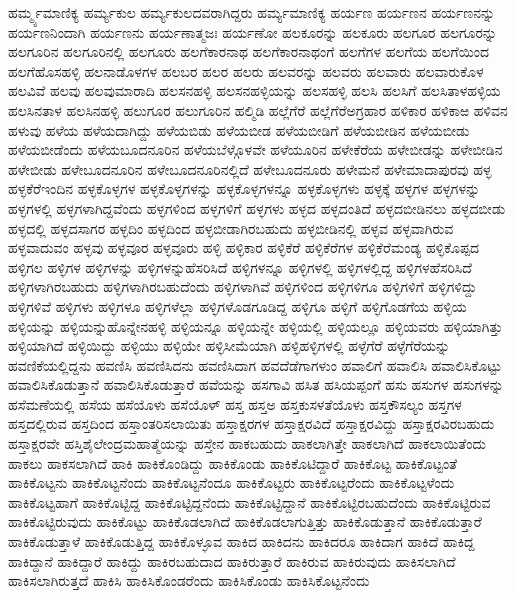 {ಹರ್ಮ್ಮ್ಯಮಾಣಿಕ್ಯ
ಹರ್ಮ್ಯಕುಲ
ಹರ್ಮ್ಯಕುಲದವರಾಗಿದ್ದರು
ಹರ್ಮ್ಯಮಾಣಿಕ್ಯ
ಹರ್ಯಣ
ಹರ್ಯಣನ
ಹರ್ಯಣನನ್ನು
ಹರ್ಯಣನಿಂದಾಗಿ
ಹರ್ಯಣನು
ಹರ್ಯಣಾತ್ಮಜಃ
ಹರ್ಯಣೋ
ಹಲಕೂರನ್ನು
ಹಲಕೂರು
ಹಲಗೂರ
ಹಲಗೂರನ್ನು
ಹಲಗೂರಿನ
ಹಲಗೂರಿನಲ್ಲಿ
ಹಲಗೂರು
ಹಲಗೆಕಾರನಾಥ
ಹಲಗೆಕಾರನಾಥಂಗೆ
ಹಲಗೆಗಳ
ಹಲಗೆಯ
ಹಲಗೆಯಿಂದ
ಹಲಗೆಹೊಸಹಳ್ಳಿ
ಹಲನಾಡೊಳಗಳ
ಹಲಬರ
ಹಲರ
ಹಲರು
ಹಲವರನ್ನು
ಹಲವರು
ಹಲವಾರು
ಹಲವಾರುಕೊಳ
ಹಲವಿವೆ
ಹಲವು
ಹಲವುಮಾರಾದಿ
ಹಲಸನಹಳ್ಳಿ
ಹಲಸನಹಳ್ಳಿಯನ್ನು
ಹಲಸಹಳ್ಳಿ
ಹಲಸಿ
ಹಲಸಿಗೆ
ಹಲಸಿತಾಳಹಳ್ಳಿಯ
ಹಲಸಿನತಾಳ
ಹಲಸಿನಹಳ್ಳಿ
ಹಲುಗೂರ
ಹಲುಗೂರಿನ
ಹಲ್ಮಿಡಿ
ಹಲ್ಲೆಗೆರೆ
ಹಲ್ಲೆಗೆರೆಅಗ್ರಹಾರ
ಹಳಿಕಾರ
ಹಳಿಕಾಱ
ಹಳಿವನ
ಹಳುವು
ಹಳೆಯ
ಹಳೆಯದಾಗಿದ್ದು
ಹಳೆಯಬಿಡು
ಹಳೆಯಬೀಡ
ಹಳೆಯಬೀಡಿಗೆ
ಹಳೆಯಬೀಡಿನ
ಹಳೆಯಬೀಡು
ಹಳೆಯಬೀಡೆಂದು
ಹಳೆಯಬೂದನೂರಿನ
ಹಳೆಯಬೆಳ್ಗೊಳವೇ
ಹಳೆಯೂರಿನ
ಹಳೇಕೆರೆಯ
ಹಳೇಬೀಡನ್ನು
ಹಳೇಬೀಡಿನ
ಹಳೇಬೀಡು
ಹಳೇಬೂದನೂರಿನ
ಹಳೇಬೂದನೂರಿನಲ್ಲಿದೆ
ಹಳೇಬೂದನೂರು
ಹಳೇಮನೆ
ಹಳೇಮಾದಾಪುರವು
ಹಳ್ಳ
ಹಳ್ಳಕೆರೆಇಂದಿನ
ಹಳ್ಳಕೊಳ್ಳಗಳ
ಹಳ್ಳಕೊಳ್ಳಗಳನ್ನು
ಹಳ್ಳಕೊಳ್ಳಗಳನ್ನೂ
ಹಳ್ಳಕೊಳ್ಳಗಳು
ಹಳ್ಳಕ್ಕೆ
ಹಳ್ಳಗಳ
ಹಳ್ಳಗಳನ್ನು
ಹಳ್ಳಗಳಲ್ಲಿ
ಹಳ್ಳಗಳಾಗಿದ್ದವೆಂದು
ಹಳ್ಳಗಳಿಂದ
ಹಳ್ಳಗಳಿಗೆ
ಹಳ್ಳಗಳು
ಹಳ್ಳದ
ಹಳ್ಳದಂತಿದೆ
ಹಳ್ಳದಬೀಡಿನಲು
ಹಳ್ಳದಬೀಡು
ಹಳ್ಳದಲ್ಲಿ
ಹಳ್ಳದಸಾಗರ
ಹಳ್ಳದಿಂ
ಹಳ್ಳದಿಂದ
ಹಳ್ಳಬೀಡಾಗಿರಬಹುದು
ಹಳ್ಳಬೀಡಿನಲ್ಲಿ
ಹಳ್ಳವ
ಹಳ್ಳವಾಗಿರುವ
ಹಳ್ಳವಾದುವಂ
ಹಳ್ಳವು
ಹಳ್ಳವೂರ
ಹಳ್ಳವೂರು
ಹಳ್ಳಿ
ಹಳ್ಳಿಕಾರ
ಹಳ್ಳಿಕೆರೆ
ಹಳ್ಳಿಕೆರೆಗಳ
ಹಳ್ಳಿಕೆರೆಮಂಡ್ಯ
ಹಳ್ಳಿಕೊಪ್ಪದ
ಹಳ್ಳಿಗಲ
ಹಳ್ಳಿಗಳ
ಹಳ್ಳಿಗಳನ್ನು
ಹಳ್ಳಿಗಳನ್ನುಹೆಸರಿಸಿದೆ
ಹಳ್ಳಿಗಳನ್ನೂ
ಹಳ್ಳಿಗಳಲ್ಲಿ
ಹಳ್ಳಿಗಳಲ್ಲಿದ್ದ
ಹಳ್ಳಿಗಳಹೆಸರಿಸಿದೆ
ಹಳ್ಳಿಗಳಾಗಿರಬಹುದು
ಹಳ್ಳಿಗಳಾಗಿರಬಹುದೆಂದು
ಹಳ್ಳಿಗಳಾಗಿವೆ
ಹಳ್ಳಿಗಳಿಂದ
ಹಳ್ಳಿಗಳಿಗೂ
ಹಳ್ಳಿಗಳಿಗೆ
ಹಳ್ಳಿಗಳಿದ್ದು
ಹಳ್ಳಿಗಳಿವೆ
ಹಳ್ಳಿಗಳು
ಹಳ್ಳಿಗಳೂ
ಹಳ್ಳಿಗಳೆಲ್ಲಾ
ಹಳ್ಳಿಗಳೊಡಗೂಡಿದ್ದ
ಹಳ್ಳಿಗೂ
ಹಳ್ಳಿಗೆ
ಹಳ್ಳಿಗೊಡಗೆಯ
ಹಳ್ಳಿಯ
ಹಳ್ಳಿಯನ್ನು
ಹಳ್ಳಿಯನ್ನುಹೊನ್ನೇನಹಳ್ಳಿ
ಹಳ್ಳಿಯನ್ನೂ
ಹಳ್ಳಿಯನ್ನೇ
ಹಳ್ಳಿಯಲ್ಲಿ
ಹಳ್ಳಿಯಲ್ಲೂ
ಹಳ್ಳಿಯವರು
ಹಳ್ಳಿಯಾಗಿತ್ತು
ಹಳ್ಳಿಯಾಗಿದೆ
ಹಳ್ಳಿಯಿದ್ದು
ಹಳ್ಳಿಯು
ಹಳ್ಳಿಯೇ
ಹಳ್ಳಿಸೀಮೆಯಾಗಿ
ಹಳ್ಳಿಹಳ್ಳಿಗಳಲ್ಲಿ
ಹಳ್ಳೆಗೆರೆ
ಹಳ್ಳೆಗೆರೆಯನ್ನು
ಹವಣಿಕೆಯಲ್ಲಿದ್ದನು
ಹವಣಿಸಿ
ಹವಣಿಸಿದನು
ಹವಣಿಸಿದಾಗ
ಹವದೆಡೆಗಾಗಳುಂ
ಹವಾಲಿಗೆ
ಹವಾಲಿಸಿ
ಹವಾಲಿಸಿಕೊಟ್ಟು
ಹವಾಲಿಸಿಕೊಡುತ್ತಾನೆ
ಹವಾಲಿಸಿಕೊಡುತ್ತಾರೆ
ಹವೆಯನ್ನು
ಹಸಗಾವಿ
ಹಸಿತ
ಹಸಿಯಪ್ಪಂಗೆ
ಹಸು
ಹಸುಗಳ
ಹಸುಗಳನ್ನು
ಹಸೆಮಣೆಯಲ್ಲಿ
ಹಸೆಯ
ಹಸೆಯೊಳು
ಹಸೆಯೊಳ್
ಹಸ್ತ
ಹಸ್ತಅ
ಹಸ್ತಕುಸಳತೆಯೊಳು
ಹಸ್ತಕೌಸಲ್ಯಂ
ಹಸ್ತಗಳ
ಹಸ್ತದಲ್ಲಿರುವ
ಹಸ್ತದಿಂದ
ಹಸ್ತಾಂತರಿಸಲಾಯಿತು
ಹಸ್ತಾಕ್ಷರಗಳ
ಹಸ್ತಾಕ್ಷರವಿದೆ
ಹಸ್ತಾಕ್ಷರವಿದ್ದು
ಹಸ್ತಾಕ್ಷರವಿರಬಹುದು
ಹಸ್ತಾಕ್ಷರವೇ
ಹಸ್ತಿಶೈಲೇಂದ್ರಮಹಾತ್ಮೆಯನ್ನು
ಹಸ್ತೇನ
ಹಾಕಬಹುದು
ಹಾಕಲಾಗಿತ್ತೇ
ಹಾಕಲಾಗಿದೆ
ಹಾಕಲಾಯಿತೆಂದು
ಹಾಕಲು
ಹಾಕಸಲಾಗಿದೆ
ಹಾಕಿ
ಹಾಕಿಕೊಂಡಿದ್ದು
ಹಾಕಿಕೊಂಡು
ಹಾಕಿಕೊಟಿದ್ದಾರೆ
ಹಾಕಿಕೊಟ್ಟ
ಹಾಕಿಕೊಟ್ಟಂತೆ
ಹಾಕಿಕೊಟ್ಟನು
ಹಾಕಿಕೊಟ್ಟನೆಂದು
ಹಾಕಿಕೊಟ್ಟನೆಂದೂ
ಹಾಕಿಕೊಟ್ಟರು
ಹಾಕಿಕೊಟ್ಟರೆಂದು
ಹಾಕಿಕೊಟ್ಟಳೆಂದು
ಹಾಕಿಕೊಟ್ಟಹಾಗೆ
ಹಾಕಿಕೊಟ್ಟಿದ್ದ
ಹಾಕಿಕೊಟ್ಟಿದ್ದನೆಂದು
ಹಾಕಿಕೊಟ್ಟಿದ್ದಾನೆ
ಹಾಕಿಕೊಟ್ಟಿರಬಹುದೆಂದು
ಹಾಕಿಕೊಟ್ಟಿರುವ
ಹಾಕಿಕೊಟ್ಟಿರುವುದು
ಹಾಕಿಕೊಟ್ಟು
ಹಾಕಿಕೊಡಲಾಗಿದೆ
ಹಾಕಿಕೊಡಲಾಗುತ್ತಿತ್ತು
ಹಾಕಿಕೊಡುತ್ತಾನೆ
ಹಾಕಿಕೊಡುತ್ತಾರೆ
ಹಾಕಿಕೊಡುತ್ತಾಳೆ
ಹಾಕಿಕೊಡುತ್ತಿದ್ದ
ಹಾಕಿಕೊಳ್ಳೂವ
ಹಾಕಿದ
ಹಾಕಿದನು
ಹಾಕಿದರೂ
ಹಾಕಿದಾಗ
ಹಾಕಿದೆ
ಹಾಕಿದ್ದ
ಹಾಕಿದ್ದಾನೆ
ಹಾಕಿದ್ದಾರೆ
ಹಾಕಿದ್ದು
ಹಾಕಿರಬಹುದಾದ
ಹಾಕಿರುತ್ತಾರೆ
ಹಾಕಿರುವ
ಹಾಕಿರುವುದು
ಹಾಕಿಸಲಾಗಿದೆ
ಹಾಕಿಸಲಾಗಿರುತ್ತದೆ
ಹಾಕಿಸಿ
ಹಾಕಿಸಿಕೊಂಡರೆಂದು
ಹಾಕಿಸಿಕೊಂಡು
ಹಾಕಿಸಿಕೊಟ್ಟನೆಂದು
}
